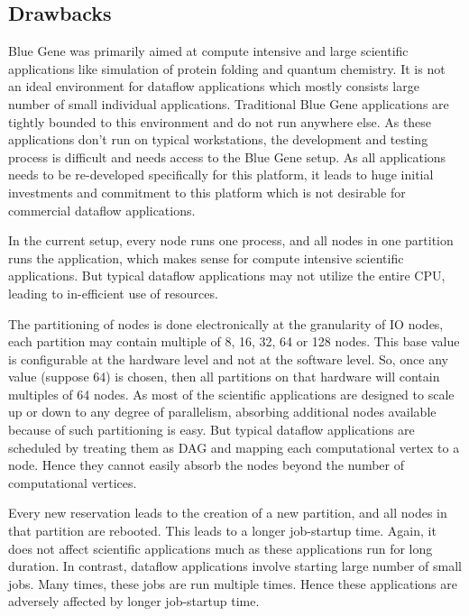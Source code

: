\subsection{Drawbacks}

Blue Gene was primarily aimed at compute intensive and large scientific applications like 
simulation of protein folding and quantum chemistry.  It is not an ideal environment for 
dataflow applications which mostly consists large
number of small individual applications.  Traditional Blue Gene applications 
are tightly bounded to this environment and do not run anywhere else.  As these
applications don't run on typical workstations, the development and testing process
is difficult and needs access to the Blue Gene setup.  As all applications needs to
be re-developed specifically for this platform, it leads to huge initial investments 
and commitment to this platform which is not desirable for commercial dataflow applications.


In the current setup, every node runs one process, and all nodes in one partition runs the application, 
which makes sense for compute intensive scientific applications.  But typical dataflow applications may not
utilize the entire CPU, leading to in-efficient use of resources.  

The partitioning of nodes is done electronically at the granularity of IO nodes, 
each partition may contain multiple of 8, 16, 32, 64 or 128 nodes.  This base value
is configurable at the hardware level and not at the software level.  So, once any value 
(suppose 64) is chosen, then all partitions on that hardware will contain multiples
of 64 nodes.  As most of the scientific applications are designed to 
scale up or down to any degree of parallelism, absorbing additional nodes available
because of such partitioning is easy.  But typical dataflow applications
are scheduled by treating them as DAG and mapping each computational vertex to a node.
Hence they cannot easily absorb the nodes beyond the number of computational vertices.

Every new reservation leads to the creation of a new partition, and all nodes in that
partition are rebooted.  This leads to a longer job-startup time.  
Again, it does not affect scientific applications much as these applications run for long 
duration.  In contrast, dataflow applications involve starting large number of small jobs.
Many times, these jobs are run multiple times.  Hence
these applications are adversely affected by longer job-startup time.

